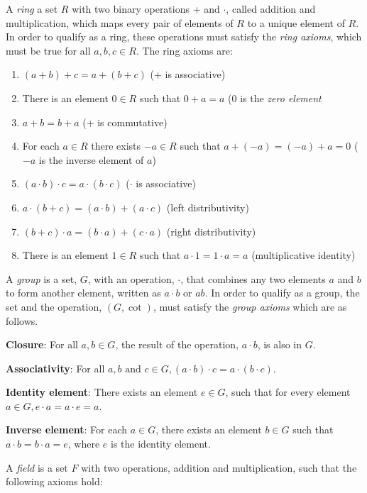 \documentclass{article}
\begin{document}
A \textit{ring} a set $R$ with two binary operations + and $\cdot$, called
addition and multiplication, which maps every pair of elements of $R$
to a unique element of $R$. In order to qualify as a ring, these operations
must satisfy the \textit{ring axioms}, which must be true for all
$a, b, c \in R$. The ring axioms are:

\begin{enumerate}
  \item $(a + b) + c = a + ( b + c)$ (+ is associative)
  \item There is an element $0 \in R$ such that $0 + a = a$ (0 is the \textit{zero element}
  \item $a + b = b + a$ (+ is commutative)
  \item For each $a \in R$ there exists $-a \in R$ such that $a + (-a) = (-a) + a = 0$ ($-a$ is the inverse element of $a$)
  \item $(a \cdot b) \cdot c = a \cdot (b \cdot c)$ ($\cdot$ is associative)
  \item $a \cdot (b + c) = (a \cdot b) + (a \cdot c)$ (left distributivity)
  \item $(b + c) \cdot a = (b \cdot a) + (c \cdot a)$ (right distributivity)
  \item There is an element $1 \in R$ such that $a \cdot 1 = 1 \cdot a = a$ (multiplicative identity)
\end{enumerate}

A \textit{group} is a set, $G$, with an operation, $\cdot$, that combines
any two elements $a$ and $b$ to form another element, written as
$a \cdot b$ or $ab$. In order to qualify as a group, the set
and the operation, $(G, \cot)$, must satisfy the \textit{group axioms}
which are as follows.

\textbf{Closure}: For all $a, b \in G$, the result of the operation,
$a \cdot b$, is also in $G$.

\textbf{Associativity}: For all $a, b \text{ and } c \in G, (a \cdot b)
\cdot c = a \cdot (b \cdot c)$.

\textbf{Identity element}: There exists an element $e \in G$, such that
for every element $a \in G, e \cdot a = a \cdot e = a$.

\textbf{Inverse element}: For each $a \in G$, there exists an element
$b \in G$ such that $a \cdot b = b \cdot a = e$, where $e$ is the
identity element.
\newline

A \textit{field} is a set $F$ with two operations, addition and multiplication,
such that the following axioms hold:
\end{document}
